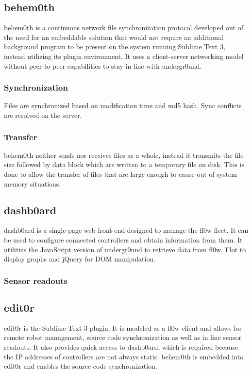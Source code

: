 \documentclass[conference]{IEEEtran}
\begin{document}
\subsection{behem0th}
behem0th is a continuous network file synchronization protocol developed out of the need for an embeddable solution that would not require an additional background program to be present on the system running Sublime Text 3\cite{Sublime Text 3:Sublime HQ}, instead utilizing its plugin environment. It uses a client-server networking model without peer-to-peer capabilities to stay in line with undergr0und.


\subsubsection{Synchronization}
Files are synchronized based on modification time and md5 hash. Sync conflicts are resolved on the server.

\subsubsection{Transfer}
behem0th neither sends nor receives files as a whole, instead it transmits the file size followed by data block which are written to a temporary file on disk. This is done to allow the transfer of files that are large enough to cause out of system memory situations.


\subsection{dashb0ard}
dashb0ard is a single-page web front-end designed to manage the fl0w fleet. It can be used to configure connected controllers and obtain information from them. It utilities the JavaScript version of undergr0und to retrieve data from fl0w, Flot\cite{Flot:David Schnur} to display graphs and jQuery\cite{jQuery:jQuery Foundation} for DOM manipulation.

\subsubsection{Sensor readouts}


\subsection{edit0r}
edit0r is the Sublime Text 3 plugin. It is modeled as a fl0w client and allows for remote robot management, source code synchronization as well as in line sensor readouts. It also provides quick access to dashb0ard, which is required because the IP addresses of controllers are not always static. behem0th\cite{behem0th:Christoph Heiss} is embedded into edit0r and enables the source code synchronization.
\end{document}
